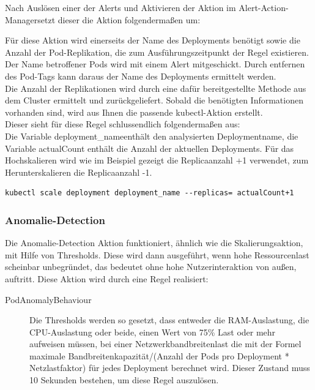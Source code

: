 \documentclass[a4paper,10pt]{scrartcl}
\begin{document}
Nach Auslösen einer der Alerts und Aktivieren der Aktion im \glqq Alert-Action-Manager\grqq setzt dieser die Aktion folgendermaßen um:

Für diese Aktion wird einerseits der Name des Deployments benötigt sowie die Anzahl der Pod-Replikation, die zum Ausführungszeitpunkt der Regel existieren.\\
Der Name betroffener Pods wird mit einem Alert mitgeschickt. Durch entfernen des Pod-Tags kann daraus der Name des Deployments ermittelt werden.\\
Die Anzahl der Replikationen wird durch eine dafür bereitgestellte Methode aus dem Cluster ermittelt und zurückgeliefert.
Sobald die benötigten Informationen vorhanden sind, wird aus Ihnen die passende kubectl-Aktion erstellt.\\
Dieser sieht für diese Regel schlussendlich folgendermaßen aus:\\
Die Variable \glqq deployment\_name\grqq enthält den analysierten Deploymentname, die Variable actualCount enthält die Anzahl der aktuellen Deployments.
Für das Hochskalieren wird wie im Beispiel gezeigt die Replicaanzahl +1 verwendet, zum Herunterskalieren die Replicaanzahl -1.

\begin{verbatim}
kubectl scale deployment deployment_name --replicas= actualCount+1
\end{verbatim}

\subsubsection{Anomalie-Detection}

Die Anomalie-Detection Aktion funktioniert, ähnlich wie die Skalierungsaktion, mit Hilfe von Thresholds. Diese wird dann ausgeführt, wenn hohe Ressourcenlast scheinbar unbegründet, das bedeutet ohne hohe Nutzerinteraktion von außen, auftritt.
Diese Aktion wird durch eine Regel realisiert:

\begin{description}
\item[PodAnomalyBehaviour]
Die Thresholds werden so gesetzt, dass entweder die RAM-Auslastung, die CPU-Auslastung oder beide, einen Wert von 75\% Last oder mehr aufweisen müssen, bei einer Netzwerkbandbreitenlast die mit der Formel maximale Bandbreitenkapazität/(Anzahl der Pods pro Deployment * Netzlastfaktor) für jedes Deployment berechnet wird. Dieser Zustand muss 10 Sekunden bestehen, um diese Regel auszulösen.
\end{description}
\end{document}
